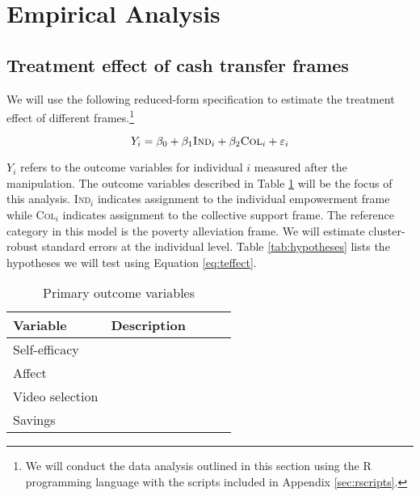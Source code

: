 \documentclass[11pt, a4paper]{article}\usepackage[]{graphicx}\usepackage[]{color}
\begin{document}
\section{Empirical Analysis}

    \subsection{Treatment effect of cash transfer frames}

        We will use the following reduced-form specification to estimate the treatment effect of different frames.\footnote{We will conduct the data analysis outlined in this section using the R programming language with the scripts included in Appendix \ref{sec:rscripts}.}

  		\begin{equation} \label{eq:teffect}
            Y_{i} = \beta_{0} + \beta_{1}\text{\textsc{Ind}}_{i} + \beta_{2}\text{\textsc{Col}}_{i} + \varepsilon_{i}
		\end{equation}

        $Y_{i}$ refers to the outcome variables for individual $i$ measured after the manipulation. The outcome variables described in Table \ref{tab:depvars} will be the focus of this analysis. \textsc{Ind}$_{i}$ indicates assignment to the individual empowerment frame while \textsc{Col}$_{i}$ indicates assignment to the collective support frame. The reference category in this model is the poverty alleviation frame. We will estimate cluster-robust standard errors at the individual level. Table \ref{tab:hypotheses} lists the hypotheses we will test using Equation \ref{eq:teffect}.

        \begin{table}[h]
        \centering
        \caption{Primary outcome variables}
        \label{tab:depvars}
        \begin{tabular}{@{}lllll@{}}
        \toprule
        Variable                                     & Description                                          &  &  &  \\ \midrule
        Self-efficacy & &  &  &  \\
        Affect & &  &  &  \\
        Video selection & &  &  &  \\
        Savings & &  &  &  \\
        \bottomrule
        \end{tabular}
        \end{table}
\end{document}
